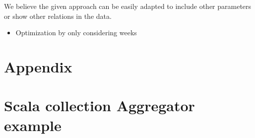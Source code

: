 \documentclass[10pt,a4paper]{article}
\renewcommand\appendix{\par
\setcounter{section}{0}%
\setcounter{subsection}{0}%
\setcounter{table}{0}
\setcounter{figure}{0}
\setcounter{equation}{0}
\gdef\thetable{\Alph{table}}
\gdef\thefigure{\Alph{figure}}
\gdef\theequation{\Alph{section}-\arabic{equation}}
\section*{Appendix}
\gdef\thesection{\Alph{section}}
\setcounter{section}{0}}
\begin{document}
We believe the given approach can be easily adapted to include other parameters or show other relations in the data.

\begin{itemize}
    \item Optimization by only considering weeks
\end{itemize}




\appendix

\section{Scala collection Aggregator example}
\end{document}
